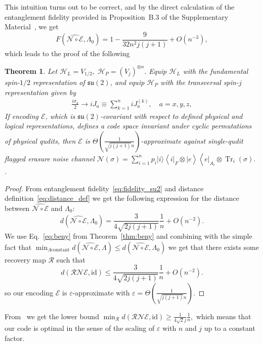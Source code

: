 \documentclass[10pt,twocolumn,superscriptaddress,aps,amsmath,amssymb,citeautoscript,floatfix,prx,longbibliography]{revtex4-2}
\newtheorem{theorem}{Theorem}
\theoremstyle{plain}
\theoremstyle{plain}
\theoremstyle{plain}
\theoremstyle{plain}
\theoremstyle{plain}
\theoremstyle{plain}
\begin{document}
This intuition turns out to be correct, and by the direct calculation of the entanglement fidelity provided in Proposition~B.3 of the Supplementary Material~\cite{SuppMat}, we get
\begin{equation}\label{eq:fidelity_su2}
    F\left(\widehat{\mathcal{N} \circ \mathcal{E}}, \Lambda_0\right)=1-\frac{9}{32 n^2 j(j+1)}+O\left(n^{-3}\right),
\end{equation}
which leads to the proof of the following
\begin{theorem}\label{thrm:su2scale}
Let
$
    \mathcal H_L=V_{1/2},\;
    \mathcal H_P=(V_j)^{\otimes n}.
$
Equip \(\mathcal H_L\) with the fundamental spin-\(1/2\) representation of
\(\mathfrak{su}(2)\), and equip \(\mathcal H_P\) with the transversal spin-\(j\)
representation given by
\begin{equation}
\begin{gathered}
\frac{i \sigma_a}{2} \rightarrow i J_a \equiv \sum_{k=1}^n i J_a^{(k)}, \quad a=x, y, z,
\end{gathered}
\end{equation} 
If encoding $\mathcal{E}$, which is $\mathfrak{su}(2)$-covariant with respect to defined physical and logical representations,  defines a code space invariant under cyclic permutations of physical qudits, then $\mathcal{E}$ is $\Theta\left(\frac{1}{\sqrt{j(j+1)}n}\right)$-approximate against single-qudit flagged erasure noise channel $\mathcal{N}(\sigma)=\sum_{i=1}^n p_i|i\rangle\left\langle\left. i\right|_F \otimes \mid e\right\rangle\left\langle\left. e\right|_{A_i} \otimes \operatorname{Tr}_i(\sigma) .\right.$ .
\end{theorem}

\begin{proof}
From entanglement fidelity~\eqref{eq:fidelity_su2} and distance definition~\eqref{eq:distance_def} we get the following expression for the distance between $\widehat{\mathcal{N} \circ \mathcal{E}}$ and $\Lambda_0$:
\[
    d(\widehat{\mathcal{N} \circ \mathcal{E}}, \Lambda_0)=\frac{3}{4 \sqrt{2 j(j+1)}} \frac{1}{n}+O\left(n^{-2}\right).
\]
We use Eq.~\eqref{eq:beny} from Theorem~\ref{thm:beny} and combining with the simple fact that 
$
\min _{\Lambda \text{constant}} d(\widehat{\mathcal{N} \circ \mathcal{E}}, \Lambda) \leq d\left(\widehat{\mathcal{N} \circ \mathcal{E}}, \Lambda_0\right)
$
we get that there exists some recovery map $\mathcal{R}$ such that
\[
    d(\mathcal{R} \mathcal{N} \mathcal{E}, \mathrm{id}) \leq \frac{3}{4 \sqrt{2 j(j+1)}} \frac{1}{n}+O\left(n^{-2}\right).
\]
so our encoding $\mathcal{E}$ is $\varepsilon$-approximate with $\varepsilon=\Theta\left(\frac{1}{\sqrt{j(j+1)}n}\right)$.
\end{proof}
From~\cite{Faist2020} we get the lower bound
$
        \min _{\mathcal{R}} d(\mathcal{R} \mathcal{N} \mathcal{E}, \mathrm{id})\geq \frac{1}{4 \sqrt{2} j} \frac{1}{n},
$
which means that our code is optimal in the sense of the scaling of $\varepsilon$ with $n$ and $j$ up to a constant factor.
\end{document}
